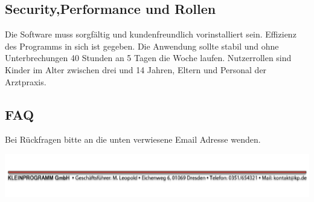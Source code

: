 \documentclass[12pt]{article}
\begin{document}
\subsection{Security,Performance und Rollen}
Die Software muss sorgfältig und kundenfreundlich vorinstalliert sein. Effizienz des Programms in sich ist gegeben. Die Anwendung sollte stabil und ohne Unterbrechungen 40 Stunden an 5 Tagen  die Woche laufen. Nutzerrollen sind Kinder im Alter zwischen drei und                     14 Jahren, Eltern und Personal der Arztpraxis.
\subsection{FAQ}
Bei Rückfragen bitte an die unten verwiesene Email Adresse wenden.


\vspace*{\fill}
\includegraphics[scale=0.9]{footer.pdf}
\thispagestyle{empty}
\end{document}
